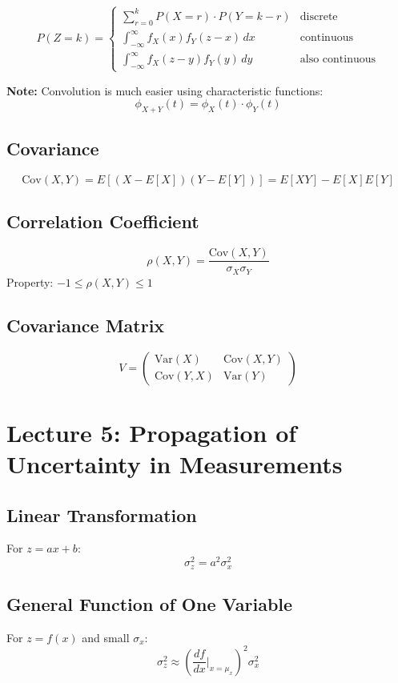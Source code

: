 \documentclass[10pt, twocolumn]{article}
\begin{document}
\[ P(Z = k) = \begin{cases}
        \sum_{r=0}^{k} P(X = r) \cdot P(Y = k - r)      & \text{discrete}        \\
        \int_{-\infty}^{\infty} f_X(x) f_Y(z - x) \, dx & \text{continuous}      \\
        \int_{-\infty}^{\infty} f_X(z - y) f_Y(y) \, dy & \text{also continuous}
    \end{cases} \]

\textbf{Note:} Convolution is much easier using characteristic functions:
\[ \phi_{X+Y}(t) = \phi_X(t) \cdot \phi_Y(t) \]

\subsection{Covariance}
\[ \text{Cov}(X,Y) = E[(X - E[X])(Y - E[Y])] = E[XY] - E[X]E[Y] \]

\subsection{Correlation Coefficient}
\[ \rho(X,Y) = \frac{\text{Cov}(X,Y)}{\sigma_X \sigma_Y} \]
Property: $-1 \leq \rho(X,Y) \leq 1$

\subsection{Covariance Matrix}
\[ V = \begin{pmatrix}
        \text{Var}(X)   & \text{Cov}(X,Y) \\
        \text{Cov}(Y,X) & \text{Var}(Y)
    \end{pmatrix} \]

\section{Lecture 5: Propagation of Uncertainty in Measurements}

\subsection{Linear Transformation}
For $z = ax + b$:
\[ \sigma_z^2 = a^2 \sigma_x^2 \]

\subsection{General Function of One Variable}
For $z = f(x)$ and small $\sigma_x$:
\[ \sigma_z^2 \approx \left(\frac{df}{dx}\bigg|_{x=\mu_x}\right)^2 \sigma_x^2 \]
\end{document}
